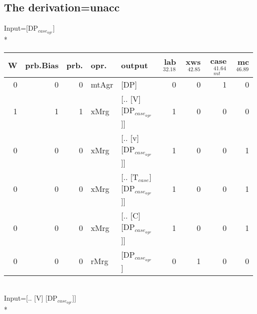 \subsection{The derivation=unacc}
\begingroup\scriptsize Input=[DP$_{case_{agr}}$]\\*
\begin{tabularx}{\linewidth}{rrrlXrrrr}
\hline
   W &   prb.Bias &   prb. & opr.    & output                      &   lab$^{32.18}$ &   xws$^{42.85}$ &   case$_{mt}^{41.64}$ &   mc$^{46.89}$ \\
\hline
   0 &       0 &   0 & mtAgr & [DP]                        &             0 &             0 &                 1 &            0 \\
   1 &       1 &   1 & xMrg  & [.. [V] [DP$_{case_{agr}}$]]      &             1 &             0 &                 0 &            0 \\
   0 &       0 &   0 & xMrg  & [.. [v] [DP$_{case_{agr}}$]]      &             1 &             0 &                 0 &            1 \\
   0 &       0 &   0 & xMrg  & [.. [T$_{case}$] [DP$_{case_{agr}}$]] &             1 &             0 &                 0 &            1 \\
   0 &       0 &   0 & xMrg  & [.. [C] [DP$_{case_{agr}}$]]      &             1 &             0 &                 0 &            1 \\
   0 &       0 &   0 & rMrg  & [DP$_{case_{agr}}$]               &             0 &             1 &                 0 &            0 \\
\hline
\end{tabularx}\endgroup\\
\begingroup\scriptsize Input=[.. [V] [DP$_{case_{agr}}$]]\\*
